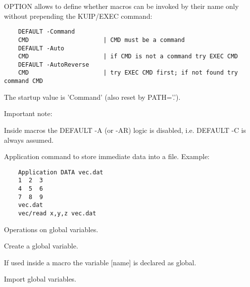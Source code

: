   \par
OPTION allows to define whether macros can be invoked by their name only 
   without prepending the KUIP/EXEC command:  
\begin{verbatim}
    DEFAULT -Command
    CMD                     | CMD must be a command
    DEFAULT -Auto
    CMD                     | if CMD is not a command try EXEC CMD
    DEFAULT -AutoReverse
    CMD                     | try EXEC CMD first; if not found try command CMD
\end{verbatim}
   \par
The startup value is 'Command' (also reset by PATH='.').  

   \par
Important note:  

   \par
Inside macros the DEFAULT -A (or -AR) logic is disabled, i.e.  DEFAULT -C 
   is always assumed.  

\ENDCMD


   \par
Application command to store immediate data into a file.  Example:  
\begin{verbatim}
    Application DATA vec.dat
    1  2  3
    4  5  6
    7  8  9
    vec.dat
    vec/read x,y,z vec.dat
\end{verbatim}

\ENDCMD
{}
\ifMENUtext
   \par
Operations on global variables.  


\fi


\BEGARG
{}
\ENDARG

   \par
Create a global variable.  

   \par
If used inside a macro the variable [name] is declared as global.  

\ENDCMD


\BEGARG
{}
\ENDARG

   \par
Import global variables.  

